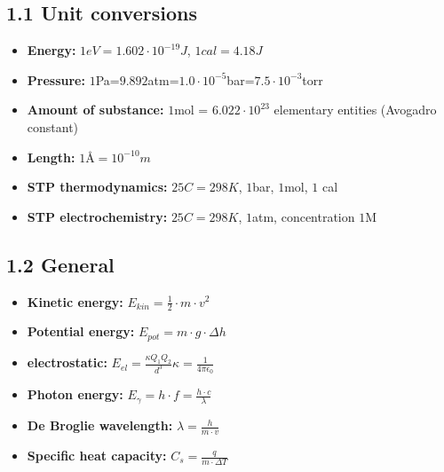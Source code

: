 \subsection{1.1 Unit conversions}
	\begin{itemize}
  		\item \textbf{Energy:} $1eV=1.602\cdot 10^{-19}J$,    $1cal=4.18J$
    	\item \textbf{Pressure:} $1$Pa=$9.892$atm=$1.0\cdot 10^{-5}$bar=$7.5\cdot 10^{-3}$torr
    	\item \textbf{Amount of substance:} $1$mol = $6.022\cdot 10^{23}$ elementary entities (Avogadro constant)
    	\item \textbf{Length:} $1\text{Å}=10^{-10}m$
    	\item \textbf{STP thermodynamics: } $25C=298K$,  $1$bar,  $1$mol, $1$ cal
    	\item \textbf{STP electrochemistry: } $25C=298K$,  $1$atm, concentration $1$M
	\end{itemize}

\subsection{1.2 General}
    \begin{itemize}
        \item \textbf{Kinetic energy:} $E_{kin} = \frac{1}{2} \cdot m \cdot v^2$
        \item \textbf{Potential energy:} $E_{pot} = m \cdot g \cdot \Delta h$
        \item \textbf{electrostatic:} $E_{el}=\frac{\kappa Q_1Q_2}{d^3}$\quad $\kappa = \frac{1}{4\pi \epsilon_0}$
        \item \textbf{Photon energy: } $E_\gamma = h\cdot f = \frac{h\cdot c}{\lambda}$
        \item \textbf{De Broglie wavelength: } $\lambda = \frac{h}{m\cdot v}$
        \item \textbf{Specific heat capacity: }$C_s=\frac{q}{m\cdot\Delta T}$
    \end{itemize}
    	
